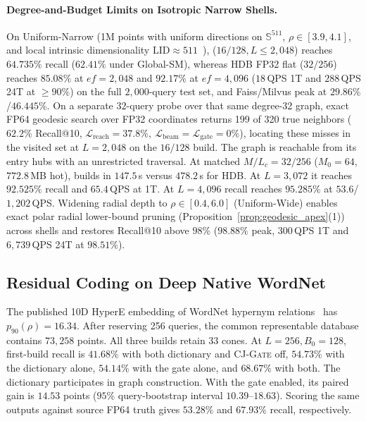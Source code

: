 \paragraph{Degree-and-Budget Limits on Isotropic Narrow Shells.}
On {Uniform-Narrow} (1M points with uniform directions on $\mathbb{S}^{511}$, $\rho \in [3.9, 4.1]$, and local intrinsic dimensionality $\mathrm{LID} \approx 511$~\cite{houle2017lid}), \rquiver{} ($16/128, L\le2{,}048$) reaches $64.735\%$ recall ($62.41\%$ under {Global-SM}), whereas {HDB FP32 flat} ($32/256$) reaches $85.08\%$ at $ef=2{,}048$ and $92.17\%$ at $ef=4{,}096$ ($18$\,QPS 1T and $288$\,QPS 24T at $\ge 90\%$) on the full $2{,}000$-query test set, and {Faiss}/{Milvus} peak at $29.86\%$/$46.445\%$.
On a separate $32$-query probe over that same degree-32 \rquiver{} graph, exact FP64 geodesic search over FP32 coordinates returns 199 of 320 true neighbors ($62.2\%$ Recall@10, $\mathcal{L}_{\mathrm{reach}}=37.8\%,\ \mathcal{L}_{\mathrm{beam}}=\mathcal{L}_{\mathrm{gate}}=0\%$), locating these misses in the visited set at $L=2{,}048$ on the $16/128$ build. The graph is reachable from its entry hubs with an unrestricted traversal.
At matched $M/L_c=32/256$ ($M_0=64$, $772.8$\,MB hot), \rquiver{} builds in $147.5$\,s versus $478.2$\,s for {HDB}. At $L=3{,}072$ it reaches $92.525\%$ recall and $65.4$\,QPS at 1T. At $L=4{,}096$ recall reaches $95.285\%$ at $53.6$/$1{,}202$\,QPS.
Widening radial depth to $\rho \in [0.4, 6.0]$ ({Uniform-Wide}) enables exact polar radial lower-bound pruning (Proposition~\ref{prop:geodesic_apex}(1)) across shells and restores Recall@10 above $98\%$ (\textbf{$98.88\%$} peak, $300$\,QPS 1T and $6{,}739$\,QPS 24T at $98.51\%$).

\subsection{Residual Coding on Deep Native WordNet}
\label{subsec:eval_deep}
The published 10D {HyperE} embedding of WordNet hypernym relations~\cite{sala2018representation} has $p_{90}(\rho)=16.34$. After reserving 256 queries, the common representable database contains $73{,}258$ points. All three builds retain 33 cones. At $L=256,B_0=128$, first-build recall is $41.68\%$ with both dictionary and \textsc{CJ-Gate} off, $54.73\%$ with the dictionary alone, $54.14\%$ with the gate alone, and $68.67\%$ with both. The dictionary participates in graph construction. With the gate enabled, its paired gain is $14.53$ points ($95\%$ query-bootstrap interval $10.39$--$18.63$). Scoring the same outputs against source FP64 truth gives $53.28\%$ and $67.93\%$ recall, respectively.

